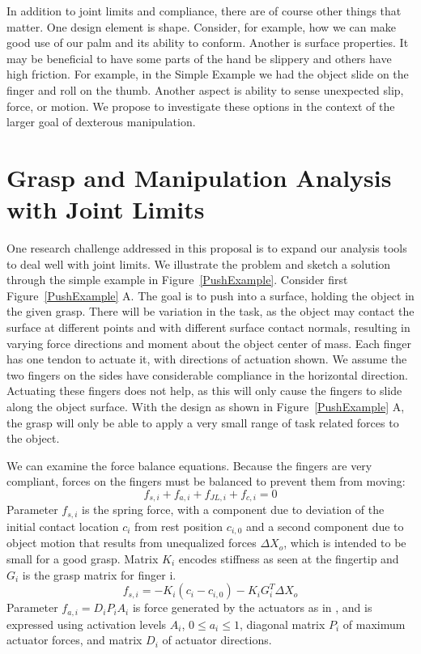 In addition to joint limits and compliance, there are of course other things that matter.   One design element is shape.   Consider, for example, how we can make good use of our palm and its ability to conform.    Another is surface properties.   It may be beneficial to have some parts of the hand be slippery and others have high friction.   For example, in the Simple Example we had the object slide on the finger and roll on the thumb.   Another aspect is ability to sense unexpected slip, force, or motion.    We propose to investigate these options in the context of the larger goal of dexterous manipulation.


\section{Grasp and Manipulation Analysis with Joint Limits}
   \label{secLimitAnalysis}

One research challenge addressed in this proposal is to expand our analysis tools to deal well with joint limits.   We illustrate the problem and sketch a solution through the simple example in Figure~\ref{PushExample}.   Consider first Figure~\ref{PushExample} A.     The goal is to push into a surface, holding the object in the given grasp.   There will be variation in the task, as the object may contact the surface at different points and with different surface contact normals, resulting in varying force directions and moment about the object center of mass.    Each finger has one tendon to actuate it, with directions of actuation shown.    We assume the two fingers on the sides have considerable compliance in the horizontal direction.   Actuating these fingers does not help, as this will only cause the fingers to slide along the object surface.    With the design as shown in Figure~\ref{PushExample} A, the grasp will only be able to apply a very small range of task related forces to the object.

We can examine the force balance equations.   Because the fingers are very compliant, forces on the fingers must be balanced to prevent them from moving:
\begin{equation}
    f_{s, i} +     f_{a, i} +     f_{JL, i} +     f_{c, i} = 0
\end{equation}
Parameter $f_{s, i}$ is the spring force, with a component due to deviation of the initial contact location $c_i$ from rest position $c_{i, 0}$ and a second component due to object motion that results from unequalized forces $\Delta X_o$, which is intended to be small for a good grasp.   Matrix $K_i$ encodes stiffness as seen at the fingertip and $G_i$ is the grasp matrix for finger i.
\begin{equation}
 f_{s, i} = -K_i ( c_i - c_{i, 0}) - K_i G^T_i \Delta X_o
\end{equation}
Parameter $f_{a, i} = D_i P_i A_i$ is force generated by the actuators as in \cite{Li:graspDB07}, and is expressed using activation levels $A_i$, $0 \leq a_i \leq 1$, diagonal matrix $P_i$ of maximum actuator forces, and matrix $D_i$ of actuator directions.

